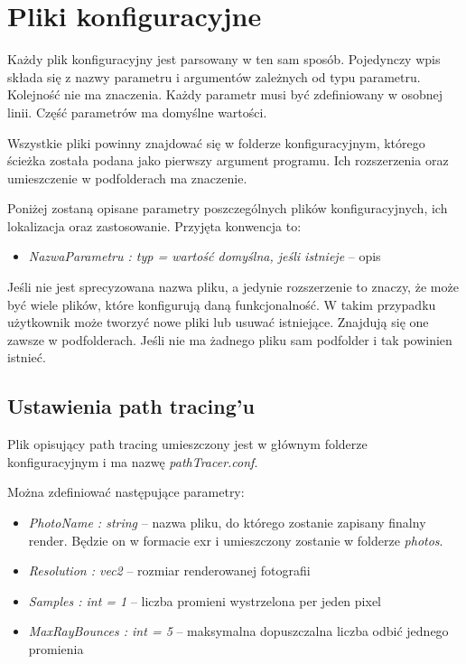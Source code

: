 \documentclass[inz,shortabstract]{iithesis}
\begin{document}
    \section{Pliki konfiguracyjne}
        Każdy plik konfiguracyjny jest parsowany w ten sam sposób. Pojedynczy wpis składa się z nazwy parametru i argumentów zależnych od typu parametru. Kolejność nie ma znaczenia. Każdy parametr musi być zdefiniowany w osobnej linii. Część parametrów ma domyślne wartości. 
        
        Wszystkie pliki powinny znajdować się w folderze konfiguracyjnym, którego ścieżka została podana jako pierwszy argument programu. Ich rozszerzenia oraz umieszczenie w podfolderach ma znaczenie.
        
        Poniżej zostaną opisane parametry poszczególnych plików konfiguracyjnych, ich lokalizacja oraz zastosowanie. Przyjęta konwencja to:
        \begin{itemize}
            \item \textit{NazwaParametru : typ = wartość domyślna, jeśli istnieje} -- opis
        \end{itemize}
        
        Jeśli nie jest sprecyzowana nazwa pliku, a jedynie rozszerzenie to znaczy, że może być wiele plików, które konfigurują daną funkcjonalność. W takim przypadku użytkownik może tworzyć nowe pliki lub usuwać istniejące. Znajdują się one zawsze w podfolderach. Jeśli nie ma żadnego pliku sam podfolder i tak powinien istnieć.
        
        \subsection{Ustawienia path tracing'u} \label{pathTracerConfig}
        Plik opisujący path tracing umieszczony jest w głównym folderze konfiguracyjnym i ma nazwę \textit{pathTracer.conf}.
        
        Można zdefiniować następujące parametry:
        \begin{itemize}
            \item \textit{PhotoName : string} -- nazwa pliku, do którego zostanie zapisany finalny render. Będzie on w formacie exr i umieszczony zostanie w folderze \textit{photos}.
            \item \textit{Resolution : vec2} -- rozmiar renderowanej fotografii
            \item \textit{Samples : int = 1} -- liczba promieni wystrzelona per jeden pixel
            \item \textit{MaxRayBounces : int = 5} -- maksymalna dopuszczalna liczba odbić jednego promienia  
        \end{itemize}
\end{document}
